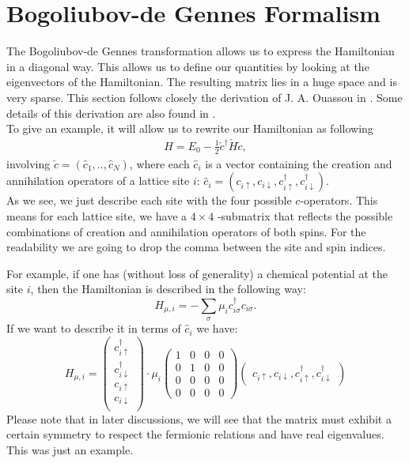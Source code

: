 \documentclass[../main.tex]{subfile}
\begin{document}
\section{Bogoliubov-de Gennes Formalism} \label{sec:BdGFormalism}
The Bogoliubov-de Gennes transformation allows us to express the Hamiltonian in a diagonal way. This allows us to 
define our quantities 
by looking at the eigenvectors of the Hamiltonian. The resulting matrix lies in a huge space and is very sparse.
This section follows closely the derivation of J. A. Ouassou in \cite{Ouassou_unpubl}. Some details of this derivation are also found in \cite{Ouassou2024}.\\

To give an example, it will allow us to rewrite our Hamiltonian as following
\begin{align}
    H = E_0 - \frac{1}{2} \check{c}^\dagger \check{H} \check{c}, \label{eq:BdG_intro_H}
\end{align}
involving $\check{c} = (\hat{c}_1,..,\hat{c}_N)$, where each $\hat{c}_i$ is a
 vector containing the creation and annihilation operators of a lattice site $i$:
$\hat{c}_i = (c_{i\uparrow} ,c_{i\downarrow}, c_{i\uparrow}^{\dagger} ,c_{i\downarrow}^{\dagger})$.\\

As we see, we just describe each site with the four possible $c$-operators. This means for each lattice site,
we have a $4\times4$ -submatrix that reflects the possible combinations of creation and annihilation operators of both spins. 
For the readability we are going to drop the comma between the site and spin indices.

For example, if one has (without loss of generality) a chemical potential at the site $i$, 
 then the Hamiltonian is described in the following way:
\[
    H_{\mu, i} = -\sum_{\sigma} \mu_i c_{i\sigma}^{\dagger} c_{i\sigma}.
\]
If we want to describe it in terms of $\hat{c}_i$ we have:
\[
    H_{\mu,i} = \begin{pmatrix}
        c_{i\uparrow}^{\dagger} \\c_{i\downarrow}^{\dagger}\\ c_{i\uparrow} \\c_{i\downarrow}\\
    \end{pmatrix}\cdot \mu_i
     \begin{pmatrix}
        1 & 0 & 0 & 0\\
        0 & 1 & 0 & 0\\
        0 & 0 & 0 & 0\\
        0 & 0 & 0 & 0
    \end{pmatrix}\begin{pmatrix}c_{i\uparrow} ,c_{i\downarrow}, c_{i\uparrow}^{\dagger} ,c_{i\downarrow}^{\dagger}\end{pmatrix}
\]
Please note that in later discussions, we will see that the matrix must exhibit a certain symmetry to respect the fermionic relations and have 
real eigenvalues. This was just an example.\\
\end{document}

